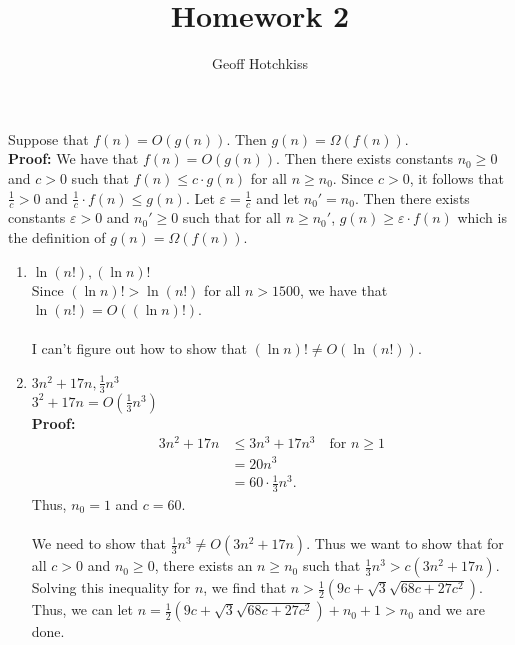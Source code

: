 \documentclass{article}
\title{Homework 2}
\author{Geoff Hotchkiss}
\renewcommand{\epsilon}{\varepsilon}
\begin{document}
\maketitle

 Suppose that $f(n) = O(g(n))$. Then $g(n) = \Omega(f(n))$. \\
{\bf Proof:} We have that $f(n) = O(g(n))$. Then there exists constants $n_0 \geq 0$ and $c > 0$ such that $f(n) \leq c \cdot g(n)$ for all $n \geq n_0$.
Since $c > 0$, it follows that $\frac{1}{c} > 0$ and $\frac{1}{c} \cdot f(n) \leq g(n)$. Let $\epsilon = \frac{1}{c}$ and let $n_0' = n_0$. Then there exists constants
$\epsilon > 0$ and $n_0' \geq 0$ such that for all $n \geq  n_0'$, $g(n) \geq \epsilon \cdot f(n)$ which is the definition of $g(n) = \Omega(f(n))$.

\begin{enumerate}
	\item $\ln(n!), (\ln n)!$ \\
				Since $(\ln n)! > \ln(n!)$ for all $n > 1500$, we have that $\ln(n!) = O((\ln n)!)$. \\ \\
				I can't figure out how to show that $(\ln n)! \neq O(\ln(n!))$.
	
	\item $3n^2 + 17n, \frac{1}{3}n^3$ \\
				$3^2 + 17n = O(\frac{1}{3}n^3)$ \\
				{\bf Proof:} 
				\begin{align*}
					3n^2 + 17n & \leq 3n^3 + 17n^3 \quad \text{for $n \geq 1$} \\
										 & = 20n^3 \\
										 & = 60 \cdot \frac{1}{3}n^3.
				\end{align*}
				Thus, $n_0 = 1$ and $c = 60$. \\ \\
				We need to show that $\frac{1}{3}n^3 \neq O(3n^2 + 17n)$. Thus we want to show that for all $c > 0$ and $n_0 \geq 0$, there exists an $n \geq n_0$
				such that $\frac{1}{3} n^3 > c(3n^2 + 17n)$. Solving this inequality for $n$, we find that $n > \frac{1}{2} \left(9 c+\sqrt{3} \sqrt{68 c+27 c^2}\right)$. Thus, we can let $n = \frac{1}{2} \left(9 c+\sqrt{3} \sqrt{68 c+27 c^2}\right) + n_0 + 1 > n_0$ and we are done.
				

\end{enumerate}
\end{document}
